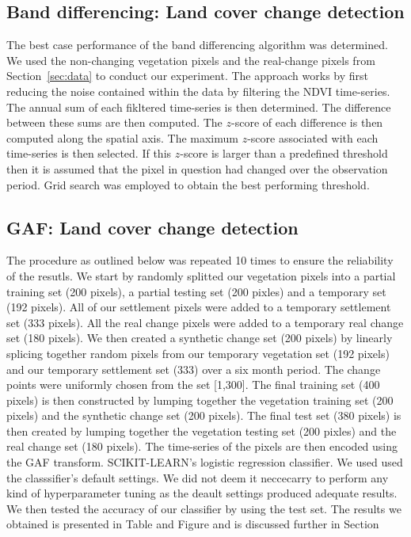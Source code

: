 \documentclass{article}
\begin{document}
\subsection{Band differencing: Land cover change detection}
\label{sec:diff}
The best case performance of the band differencing algorithm was determined. We used the non-changing vegetation pixels and the real-change pixels from Section~\ref{sec:data} to conduct our experiment. The approach works by first reducing the noise contained within the data by filtering the NDVI time-series. The annual sum of each fikltered time-series is then determined. The difference between these sums are then computed. The $z$-score of each difference is then computed along the spatial axis. The maximum $z$-score associated with each time-series is then selected. If this $z$-score is larger than a predefined threshold then it is assumed that the pixel in question had changed over the observation period. Grid search was employed to obtain the best performing threshold.


\subsection{GAF: Land cover change detection}
\label{sec:gaf_change}
The procedure as outlined below was repeated 10 times to ensure the reliability of the resutls. We start by randomly splitted our vegetation pixels into a partial training set (200 pixels), a partial testing set (200 pixles) and a temporary set (192 pixels). All of our settlement pixels were added to a temporary settlement set (333 pixels). All the real change pixels were added to a temporary real change set (180 pixels). We then created a synthetic change set (200 pixels) by linearly splicing together random pixels from our temporary vegetation set (192 pixels) and our temporary settlement set (333) over a six month period. The change points were uniformly chosen from the set [1,300]. The final training  set (400 pixels) is then constructed by lumping together the vegetation training set (200 pixels) and the synthetic change set (200 pixels). The final test set (380 pixels) is then created by lumping together the vegetation testing set (200 pixles) and the real change set (180 pixels). The time-series of the pixels are then encoded using the GAF transform. \textsc{SCIKIT-LEARN}'s logistic regression classifier. We used used the classsifier's default settings. We did not deem it neccecarry to perform any kind of hyperparameter tuning as the deault settings produced adequate results. We then tested the accuracy of our classifier by using the test set. The results we obtained is presented in Table and Figure and is discussed further in Section
\end{document}
